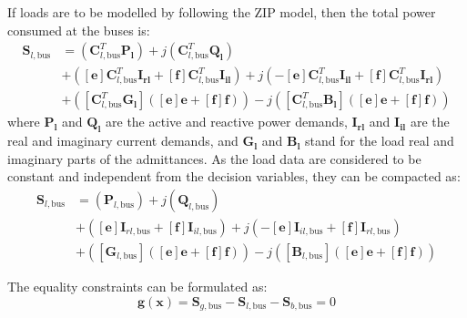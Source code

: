 \documentclass{article}
\begin{document}
If loads are to be modelled by following the ZIP model, then the total power consumed at the buses is:
\begin{equation}
    \begin{split}
    \bm{S}_{l,\text{bus}} & = (\bm{C}_{l,\text{bus}}^T\bm{P_l}) + j (\bm{C}_{l,\text{bus}}^T\bm{Q_l}) \\
                          & + ([\bm{e}]\bm{C}_{l,\text{bus}}^T \bm{I_{rl}} + [\bm{f}]\bm{C}_{l,\text{bus}}^T \bm{I_{il}}) + j(-[\bm{e}]\bm{C}_{l,\text{bus}}^T \bm{I_{il}} + [\bm{f}]\bm{C}_{l,\text{bus}}^T \bm{I_{rl}}) \\
                          & + ([\bm{C}_{l,\text{bus}}^T \bm{G_l}]([\bm{e}]\bm{e} + [\bm{f}]\bm{f})) -j([\bm{C}_{l,\text{bus}}^T \bm{B_l}]([\bm{e}]\bm{e} + [\bm{f}]\bm{f}))
    \end{split}
\end{equation}
where $\bm{P_l}$ and $\bm{Q_l}$ are the active and reactive power demands, $\bm{I_{rl}}$ and $\bm{I_{il}}$ are the real and imaginary current demands, and $\bm{G_l}$ and $\bm{B_l}$ stand for the load real and imaginary parts of the admittances. As the load data are considered to be constant and independent from the decision variables, they can be compacted as:
\begin{equation}
    \begin{split}
    \bm{S}_{l,\text{bus}} & = (\bm{P}_{l,\text{bus}}) + j (\bm{Q}_{l,\text{bus}}) \\
                          & + ([\bm{e}]\bm{I}_{rl,\text{bus}} + [\bm{f}]\bm{I}_{il,\text{bus}}) + j(-[\bm{e}]\bm{I}_{il,\text{bus}} + [\bm{f}]\bm{I}_{rl,\text{bus}}) \\
                          & + ([\bm{G}_{l,\text{bus}}]([\bm{e}]\bm{e} + [\bm{f}]\bm{f})) -j([\bm{B}_{l,\text{bus}}]([\bm{e}]\bm{e} + [\bm{f}]\bm{f}))
    \end{split}
\end{equation}

The equality constraints can be formulated as:
\begin{equation}
    \bm{g(x)} = \bm{S}_{g,\text{bus}} - \bm{S}_{l,\text{bus}} - \bm{S}_{b,\text{bus}} = 0
\end{equation}
\end{document}
